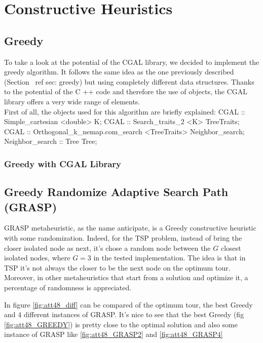\chapter{Constructive Heuristics}

\section{Greedy}\label{sec:greedy}
To take a look at the potential of the CGAL library, we decided to implement the greedy algorithm. It follows the same idea as the one previously described (Section \ ref {sec: greedy}) but using completely different data structures. Thanks to the potential of the C ++ code and therefore the use of objects, the CGAL library offers a very wide range of elements.\\ First of all, the objects used for this algorithm are briefly explained:
CGAL :: Simple_cartesian <double> K;
CGAL :: Search_traits_2 <K> TreeTraits;
CGAL :: Orthogonal_k_nemap.com_search <TreeTraits> Neighbor_search;
Neighbor_search :: Tree Tree;
\subsection{Greedy with CGAL Library}

\section{Greedy Randomize Adaptive Search Path (GRASP)}
GRASP metaheuristic, as the name anticipate, is a Greedy constructive heuristic with some randomization. Indeed, for the TSP problem, instead of bring the closer isolated node as next, it's chose a random node between the $ G $ closest isolated nodes, where $ G = 3 $ in the tested implementation.
The idea is that in TSP it's not always the closer to be the next node on the optimum tour. Moreover, in other metaheuristics that start from a solution and optimize it, a percentage of randomness is appreciated.

In figure \ref{fig:att48_diff} can be compared of the optimum tour, the best Greedy and 4 different instances of GRASP. It's nice to see that the best Greedy (fig \ref{fig:att48_GREEDY}) is pretty close to the optimal solution and also some instance of GRASP like \ref{fig:att48_GRASP2} and \ref{fig:att48_GRASP4}

